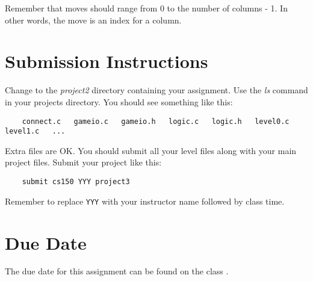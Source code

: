 \documentclass{article}
\begin{document}
Remember that moves should range from 0 to the number of columns - 1. In other words, the move is an index for a column.

\section*{Submission Instructions}

Change to the {\it project2} directory containing your assignment.  Use the
{\it ls} command in your projects directory. You should see something like this:

\begin{verbatim}
    connect.c   gameio.c   gameio.h   logic.c   logic.h   level0.c   level1.c   ...
\end{verbatim}

Extra files are OK. You should submit all your level files along with your main project files. Submit your project like this:

\begin{verbatim}
    submit cs150 YYY project3
\end{verbatim}

Remember to replace {\tt YYY} with your instructor name followed by class
time.

\section*{Due Date}

The due date for this assignment can be found on the class
.
\end{document}
